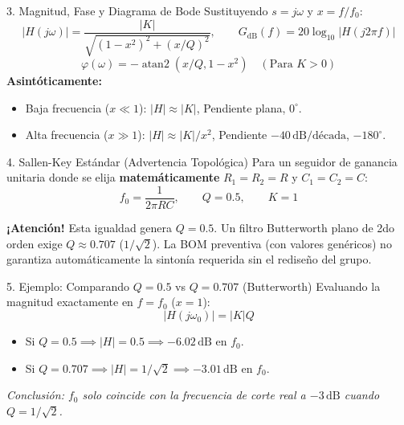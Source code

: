 \documentclass[aspectratio=169, 10pt]{beamer}
\begin{document}
\begin{frame}{3. Magnitud, Fase y Diagrama de Bode}
    Sustituyendo $s = j\omega$ y $x = f/f_0$:
    \begin{equation}
        |H(j\omega)| = \frac{|K|}{\sqrt{(1-x^2)^2 + (x/Q)^2}}, \qquad G_{\mathrm{dB}}(f) = 20\log_{10}|H(j2\pi f)|
    \end{equation}
    \begin{equation}
        \varphi(\omega) = -\operatorname{atan2}(x/Q, 1-x^2) \quad (\text{Para } K > 0)
    \end{equation}
    \vspace{0.2cm}
    \textbf{Asintóticamente:}
    \begin{itemize}
        \item Baja frecuencia ($x \ll 1$): $|H| \approx |K|$, Pendiente plana, $0^\circ$.
        \item Alta frecuencia ($x \gg 1$): $|H| \approx |K|/x^2$, Pendiente $-40\,\mathrm{dB}/\text{década}$, $-180^\circ$.
    \end{itemize}
\end{frame}

\begin{frame}{4. Sallen-Key Estándar (Advertencia Topológica)}
    Para un seguidor de ganancia unitaria donde se elija \textbf{matemáticamente} $R_1=R_2=R$ y $C_1=C_2=C$:
    \begin{equation}
        f_0 = \frac{1}{2\pi R C}, \qquad Q = 0.5, \qquad K = 1
    \end{equation}
    \vspace{0.2cm}
    \begin{tcolorbox}[colback=white, colframe=red!70!black]
        \textbf{¡Atención!} Esta igualdad genera $Q=0.5$. Un filtro Butterworth plano de 2do orden exige $Q \approx 0.707$ ($1/\sqrt{2}$). La BOM preventiva (con valores genéricos) no garantiza automáticamente la sintonía requerida sin el rediseño del grupo.
    \end{tcolorbox}
\end{frame}

\begin{frame}{5. Ejemplo: Comparando $Q=0.5$ vs $Q=0.707$ (Butterworth)}
    Evaluando la magnitud exactamente en $f = f_0$ ($x=1$):
    \begin{equation*}
        |H(j\omega_0)| = |K|Q
    \end{equation*}
    \begin{itemize}
        \item Si $Q = 0.5 \implies |H| = 0.5 \implies \mathbf{-6.02\,\mathrm{dB}}$ en $f_0$.
        \item Si $Q = 0.707 \implies |H| = 1/\sqrt{2} \implies \mathbf{-3.01\,\mathrm{dB}}$ en $f_0$.
    \end{itemize}
    \vspace{0.5cm}
    \textit{Conclusión: $f_0$ solo coincide con la frecuencia de corte real a $-3\,\mathrm{dB}$ cuando $Q = 1/\sqrt{2}$.}
\end{frame}
\end{document}
